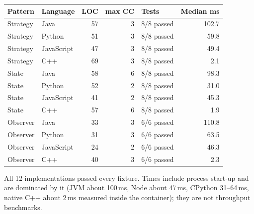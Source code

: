 \documentclass[11pt,a4paper]{article}
\begin{document}
\begin{tabular}{@{}llrrlr@{}}\toprule Pattern & Language & LOC & max CC & Tests & Median ms\\\midrule
Strategy & Java & 57 & 3 & 8/8 passed & 102.7 \\
Strategy & Python & 51 & 3 & 8/8 passed & 59.8 \\
Strategy & JavaScript & 47 & 3 & 8/8 passed & 49.4 \\
Strategy & C++ & 69 & 3 & 8/8 passed & 2.1 \\
State & Java & 58 & 6 & 8/8 passed & 98.3 \\
State & Python & 52 & 2 & 8/8 passed & 31.0 \\
State & JavaScript & 41 & 2 & 8/8 passed & 45.3 \\
State & C++ & 57 & 6 & 8/8 passed & 1.9 \\
Observer & Java & 33 & 3 & 6/6 passed & 110.8 \\
Observer & Python & 31 & 3 & 6/6 passed & 63.5 \\
Observer & JavaScript & 24 & 2 & 6/6 passed & 46.3 \\
Observer & C++ & 40 & 3 & 6/6 passed & 2.3 \\
\bottomrule\end{tabular}

All 12 implementations passed every fixture. Times include process start-up and are dominated by it (JVM about 100\,ms, Node about 47\,ms,
CPython 31--64\,ms, native C++ about 2\,ms measured inside the container); they are not throughput benchmarks.
\end{document}

